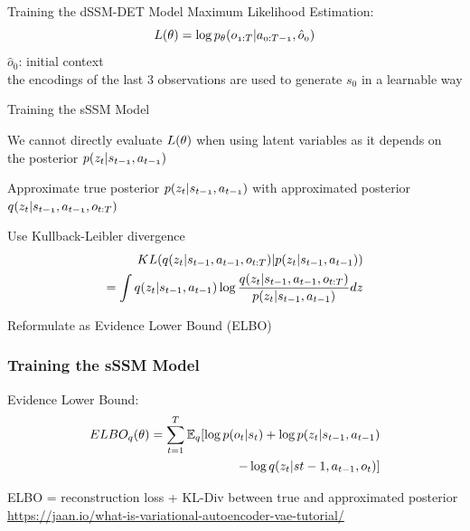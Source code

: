 \begin{frame}{Training the dSSM-DET Model}
    Maximum Likelihood Estimation:
    \begin{equation}
    \mathnormal{
            L(\theta) = \log p_{\theta}(o_{1:T}|a_{0:T-1}, \hat{o}_0)}
    \end{equation}
        $\hat{o}_0$: initial context\\
        the encodings of the last 3 observations are used to generate $s_0$ in a learnable way
    
\end{frame}

\begin{frame}{Training the sSSM Model}
		\begin{PraesentationAufzaehlung}
			\item We cannot directly evaluate $\mathnormal{L(\theta)}$ when using latent variables as it depends on the posterior $\mathnormal{p(z_t|s_{t-1},a_{t-1})}$
			\item Approximate true posterior $\mathnormal{p(z_t|s_{t-1},a_{t-1})}$ with approximated posterior $\mathnormal{q(z_t|s_{t-1},a_{t-1},o_{t:T})}$
			\item Use Kullback-Leibler divergence
			\begin{equation}
			\mathnormal{
			\begin{aligned}
			KL(q(z_t|s_{t-1},a_{t-1},o_{t:T})|p(z_t|s_{t-1},a_{t-1})) \\= \int q(z_t|s_{t-1},a_{t-1}) \log \frac{q(z_t|s_{t-1},a_{t-1},o_{t:T})}{p(z_t|s_{t-1},a_{t-1})}dz
			\end{aligned}	
			}		
			\end{equation}
			\item Reformulate as Evidence Lower Bound (ELBO)
		\end{PraesentationAufzaehlung}
\end{frame}

\begin{frame}
	\frametitle{Training the sSSM Model}
		\vspace{-10mm}
        Evidence Lower Bound:
        \begin{equation}
		\mathnormal{
        \begin{aligned}
            ELBO_q(\theta) = \sum_{t=1}^T \operatorname{\mathbb{E}}_q[\log p(o_t|s_t) + \log p(z_t|s_{t-1}, a_{t-1})\\ - \log q(z_t|s{t-1}, a_{t-1}, o_t)]
        \end{aligned}
		}
        \end{equation}
        
        ELBO = reconstruction loss + KL-Div between true and approximated posterior\\
        \vspace{10mm}
        \href{https://jaan.io/what-is-variational-autoencoder-vae-tutorial/}{https://jaan.io/what-is-variational-autoencoder-vae-tutorial/}
\end{frame}

